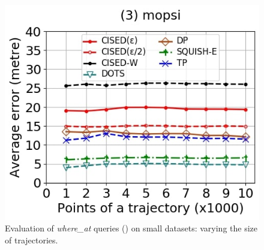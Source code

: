{\begin{figure}[tb!]
	\includegraphics[scale=0.250]{Figures/Exp-where-SED-error-size-mopsi.jpg}		
	\vspace{-2ex}
	\caption{\small Evaluation of {\emph{where\_at}} queries (\sed) on small datasets: varying the size of
		trajectories.}
	\label{fig:query-sed-size}
	\vspace{-1ex}
\end{figure}


}
